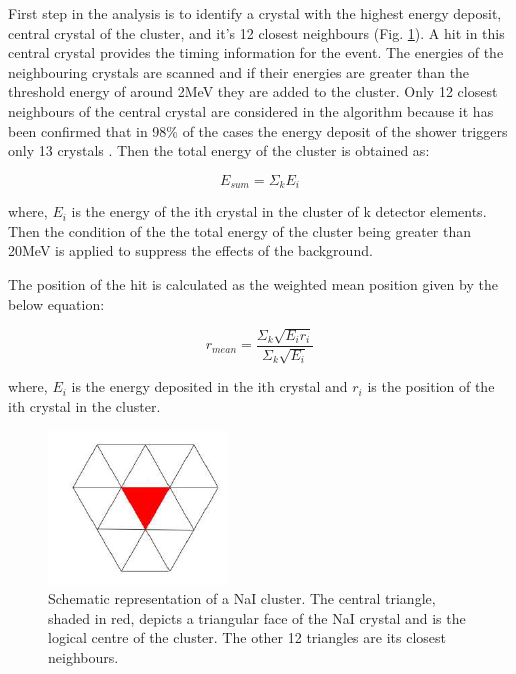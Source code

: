 \indent First step in the analysis is to identify a crystal with the highest energy deposit, central crystal of the cluster, and it's 12 closest neighbours (Fig. \ref{cbcluster}). A hit in this central crystal provides the timing information for the event. The energies of the neighbouring crystals are scanned and if their energies are greater than the threshold energy of around 2MeV they are added to the cluster. Only 12 closest neighbours of the central crystal are considered in the algorithm because it has been confirmed that in 98\% of the cases the energy deposit of the shower triggers only 13 crystals \cite{claire}. Then the total energy of the cluster is obtained as:

\begin{equation}
E_{sum}=\Sigma_{k}E_{i}
\end{equation}

where, $E_{i}$ is the energy of the ith crystal in the cluster of k detector elements. Then the condition of the the total energy of the cluster being greater than 20MeV  is applied to suppress the effects of the background.

\indent The position of the hit is calculated as the weighted mean position given by the below equation:

\begin{equation}
r_{mean}=\frac{\Sigma_{k}\sqrt{E_{i}r_{i}}}{\Sigma_{k}\sqrt{E_{i}}}
\end{equation}

where, $E_{i}$ is the energy deposited in the ith crystal and $r_{i}$ is the position of the ith crystal in the cluster.

\begin{figure}[H]
\begin{center}
\includegraphics[scale=0.55]{pictures/png/cbcluster.png}
\caption{Schematic representation of a NaI cluster. The central triangle, shaded in red, depicts a triangular face of the NaI crystal and is the logical centre of the cluster. The other 12 triangles are its closest neighbours.}
\label{cbcluster}
\end{center}
\end{figure}

